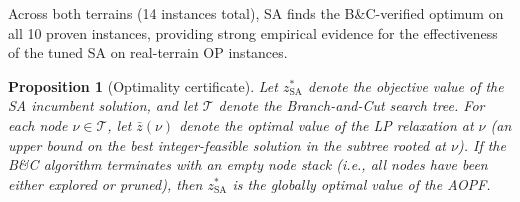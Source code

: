\documentclass[11pt,a4paper]{article}
\newtheorem{proposition}{Proposition}
\begin{document}
Across both terrains (14 instances total), SA finds the B\&C-verified optimum on all 10 proven instances, providing strong empirical evidence for the effectiveness of the tuned SA on real-terrain OP instances.

\begin{proposition}[Optimality certificate]
\label{prop:optimality}
Let $z^*_{\text{SA}}$ denote the objective value of the SA incumbent solution, and let $\mathcal{T}$ denote the Branch-and-Cut search tree.
For each node $\nu \in \mathcal{T}$, let $\bar{z}(\nu)$ denote the optimal value of the LP relaxation at $\nu$ (an upper bound on the best integer-feasible solution in the subtree rooted at $\nu$).
If the B\&C algorithm terminates with an empty node stack (i.e., all nodes have been either explored or pruned), then $z^*_{\text{SA}}$ is the globally optimal value of the AOPF.
\end{proposition}
\end{document}
